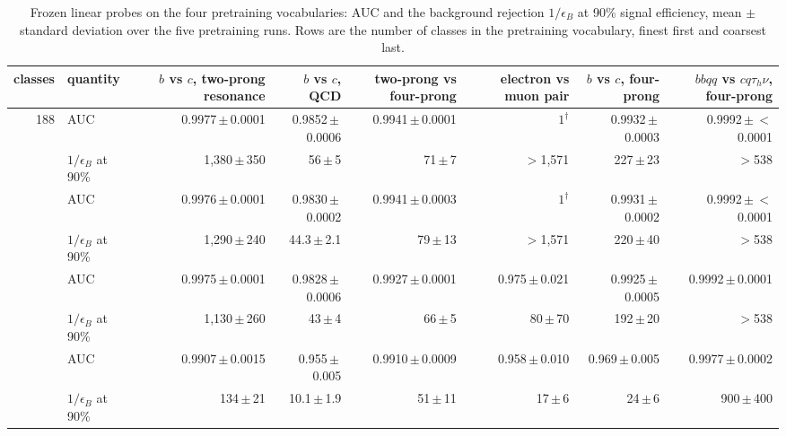 \begin{table}[t]
\centering
\small
\setlength{\tabcolsep}{4pt}
\caption{Frozen linear probes on the four pretraining vocabularies: AUC and the background rejection $1/\epsilon_B$ at 90\% signal efficiency, mean $\pm$ standard deviation over the five pretraining runs. Rows are the number of classes in the pretraining vocabulary, finest first and coarsest last.}
\label{tab:probes-linear}
\begin{adjustbox}{max width=\linewidth}
\begin{tabular}{r l rrrrrr}
\toprule
classes & quantity & $b$ vs $c$, two-prong resonance & $b$ vs $c$, QCD & two-prong vs four-prong & electron vs muon pair & $b$ vs $c$, four-prong & $bbqq$ vs $cq\tau_h\nu$, four-prong \\
\midrule
188 & AUC & 0.9977\,$\pm$\,0.0001 & 0.9852\,$\pm$\,0.0006 & 0.9941\,$\pm$\,0.0001 & $1^{\dagger}$ & 0.9932\,$\pm$\,0.0003 & 0.9992\,$\pm$\,$<$0.0001 \\
     & $1/\epsilon_B$ at 90\% & 1{,}380\,$\pm$\,350 & 56\,$\pm$\,5 & 71\,$\pm$\,7 & $>$1{,}571 & 227\,$\pm$\,23 & $>$538 \\
\addlinespace
162 & AUC & 0.9976\,$\pm$\,0.0001 & 0.9830\,$\pm$\,0.0002 & 0.9941\,$\pm$\,0.0003 & $1^{\dagger}$ & 0.9931\,$\pm$\,0.0002 & 0.9992\,$\pm$\,$<$0.0001 \\
     & $1/\epsilon_B$ at 90\% & 1{,}290\,$\pm$\,240 & 44.3\,$\pm$\,2.1 & 79\,$\pm$\,13 & $>$1{,}571 & 220\,$\pm$\,40 & $>$538 \\
\addlinespace
43 & AUC & 0.9975\,$\pm$\,0.0001 & 0.9828\,$\pm$\,0.0006 & 0.9927\,$\pm$\,0.0001 & 0.975\,$\pm$\,0.021 & 0.9925\,$\pm$\,0.0005 & 0.9992\,$\pm$\,0.0001 \\
     & $1/\epsilon_B$ at 90\% & 1{,}130\,$\pm$\,260 & 43\,$\pm$\,4 & 66\,$\pm$\,5 & 80\,$\pm$\,70 & 192\,$\pm$\,20 & $>$538 \\
\addlinespace
17 & AUC & 0.9907\,$\pm$\,0.0015 & 0.955\,$\pm$\,0.005 & 0.9910\,$\pm$\,0.0009 & 0.958\,$\pm$\,0.010 & 0.969\,$\pm$\,0.005 & 0.9977\,$\pm$\,0.0002 \\
     & $1/\epsilon_B$ at 90\% & 134\,$\pm$\,21 & 10.1\,$\pm$\,1.9 & 51\,$\pm$\,11 & 17\,$\pm$\,6 & 24\,$\pm$\,6 & 900\,$\pm$\,400 \\
\bottomrule
\end{tabular}
\end{adjustbox}
\par{}
\par{}
\par{}
\end{table}

